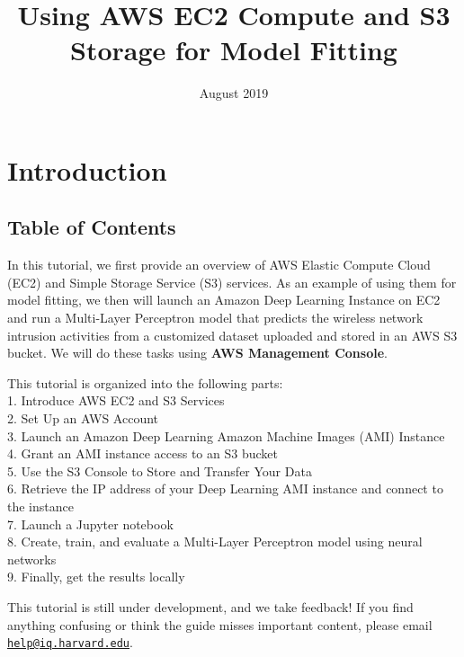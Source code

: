 \documentclass[]{book}
\title{Using AWS EC2 Compute and S3 Storage for Model Fitting}
\author{}
\date{August 2019}
\begin{document}
\maketitle

{
\setcounter{tocdepth}{1}
\tableofcontents
}
\hypertarget{introduction}{%
\chapter*{Introduction}\label{introduction}}

\hypertarget{table-of-contents}{%
\section*{Table of Contents}\label{table-of-contents}}

In this tutorial, we first provide an overview of AWS Elastic Compute Cloud (EC2) and Simple Storage Service (S3) services. As an example of using them for model fitting, we then will launch an Amazon Deep Learning Instance on EC2 and run a Multi-Layer Perceptron model that predicts the wireless network intrusion activities from a customized dataset uploaded and stored in an AWS S3 bucket. We will do these tasks using \textbf{AWS Management Console}.

This tutorial is organized into the following parts:\\
1. Introduce AWS EC2 and S3 Services\\
2. Set Up an AWS Account\\
3. Launch an Amazon Deep Learning Amazon Machine Images (AMI) Instance\\
4. Grant an AMI instance access to an S3 bucket\\
5. Use the S3 Console to Store and Transfer Your Data\\
6. Retrieve the IP address of your Deep Learning AMI instance and connect to the instance\\
7. Launch a Jupyter notebook\\
8. Create, train, and evaluate a Multi-Layer Perceptron model using neural networks\\
9. Finally, get the results locally

This tutorial is still under development, and we take feedback! If you find anything confusing or think the guide misses important content, please email \href{mailto:help@iq.harvard.edu}{\nolinkurl{help@iq.harvard.edu}}.
\end{document}
